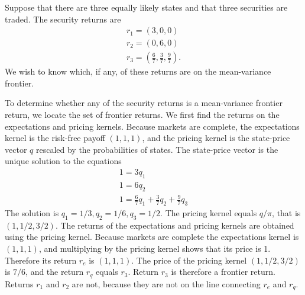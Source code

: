 \documentclass[\topdir/lecture\_notes.tex]{subfiles}
\begin{document}

\begin{example}\label{ex:mean_variance_frontier_example} Suppose that there are three equally likely states and that three securities are traded. The security returns are
\begin{gather*}
r_{1}=(3,0,0) \\
r_{2}=(0,6,0) \\
r_{3}=\left(\frac{6}{7}, \frac{3}{7}, \frac{9}{7}\right) . 
\end{gather*}
We wish to know which, if any, of these returns are on the mean-variance frontier.

To determine whether any of the security returns is a mean-variance frontier return, we locate the set of frontier returns. We first find the returns on the expectations and pricing kernels. Because markets are complete, the expectations kernel is the risk-free payoff $(1,1,1)$, and the pricing kernel is the state-price vector $q$ rescaled by the probabilities of states. The state-price vector is the unique solution to the equations
\begin{gather*}
1=3 q_{1} \\
1=6 q_{2} \\
1=\frac{6}{7} q_{1}+\frac{3}{7} q_{2}+\frac{9}{7} q_{3} 
\end{gather*}
The solution is $q_{1}=1 / 3, q_{2}=1 / 6, q_{3}=1 / 2$. The pricing kernel equals $q / \pi$, that is $(1,1 / 2,3 / 2)$.
The returns of the expectations and pricing kernels are obtained using the pricing kernel. Because markets are complete the expectations kernel is $(1,1,1)$, and multiplying by the pricing kernel shows that its price is 1. Therefore its return $r_{e}$ is $(1,1,1)$. The price of the pricing kernel $(1,1 / 2,3 / 2)$ is $7 / 6$, and the return $r_{q}$ equals $r_{3}$. Return $r_{3}$ is therefore a frontier return. Returns $r_{1}$ and $r_{2}$ are not, because they are not on the line connecting $r_{e}$ and $r_{q}$.
\end{example}
\end{document}
